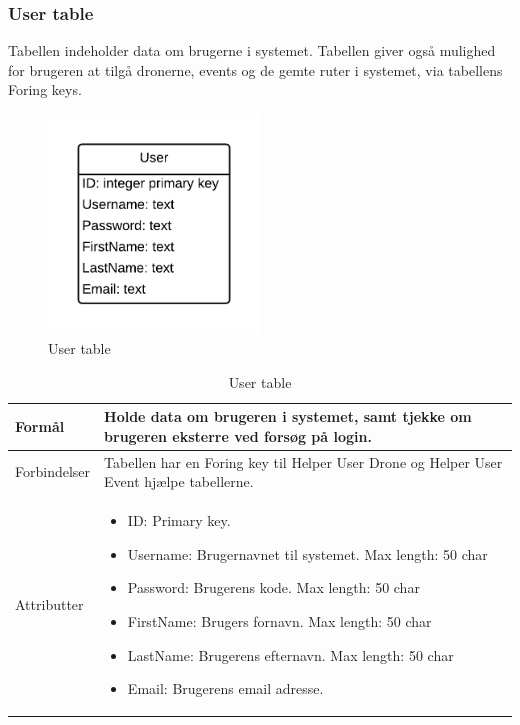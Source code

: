 \subsubsection{User table}
Tabellen indeholder data om brugerne i systemet. Tabellen giver også mulighed for brugeren at tilgå dronerne, events og de gemte ruter i systemet, via tabellens Foring keys.
\vspace{-5pt}
\begin{figure}[H]
	\centering
	\includegraphics[width=0.5\textwidth]{Billeder/database/UserTabel.png}
	\vspace{-5pt}
	\caption{User table}
	\label{fig:user_table}
\end{figure}

\begin{table}[H]
\begin{tabular}{| p{3cm}| p{11.5cm}|}
\hline

Formål	 							& Holde data om brugeren i systemet, samt tjekke om brugeren eksterre ved forsøg på login.\\\hline
Forbindelser						& Tabellen har en Foring key til Helper User Drone og Helper User Event hjælpe tabellerne.\\\hline
Attributter						& \begin{itemize}
												\item ID: Primary key.
												\item Username: Brugernavnet til systemet. Max length: 50 char
												\item Password: Brugerens kode. Max length: 50 char
												\item FirstName: Brugers fornavn. Max length: 50 char
												\item LastName: Brugerens efternavn. Max length: 50 char
												\item Email: Brugerens email adresse.
											\end{itemize} \\\hline 
\end{tabular}
\caption{User table}
\label{tab:user_table}
\end{table}